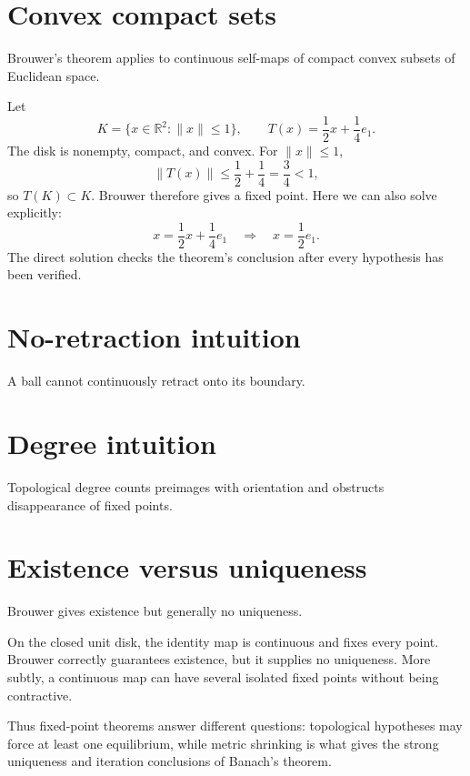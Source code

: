 \section{Convex compact sets}
Brouwer's theorem applies to continuous self-maps of compact convex subsets of Euclidean space.


\begin{example}\label{ex:ii17-expand-01}
Let
\[
K=\{x\in\mathbb R^2:\|x\|\le1\},\qquad
T(x)=\frac12x+\frac14e_1.
\]
The disk is nonempty, compact, and convex. For \(\|x\|\le1\),
\[
\|T(x)\|\le\frac12+\frac14=\frac34<1,
\]
so \(T(K)\subset K\). Brouwer therefore gives a fixed point. Here we can also
solve explicitly:
\[
x=\frac12x+\frac14e_1\quad\Rightarrow\quad x=\frac12e_1.
\]
The direct solution checks the theorem's conclusion after every hypothesis has
been verified.
\end{example}
\section{No-retraction intuition}
A ball cannot continuously retract onto its boundary.

\section{Degree intuition}
Topological degree counts preimages with orientation and obstructs disappearance of fixed points.

\section{Existence versus uniqueness}
Brouwer gives existence but generally no uniqueness.


\begin{example}\label{ex:ii17-expand-02}
On the closed unit disk, the identity map is continuous and fixes every point.
Brouwer correctly guarantees existence, but it supplies no uniqueness. More
subtly, a continuous map can have several isolated fixed points without being
contractive.

Thus fixed-point theorems answer different questions: topological hypotheses
may force at least one equilibrium, while metric shrinking is what gives the
strong uniqueness and iteration conclusions of Banach's theorem.
\end{example}
